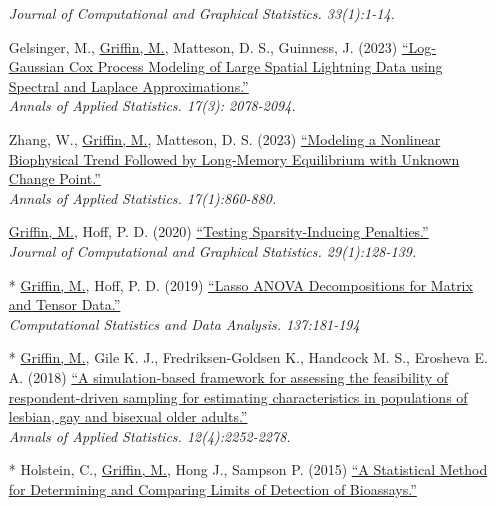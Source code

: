 \documentclass[11pt]{article}
\newcommand{\tab}{\hspace*{2em}}
\begin{document}
\begin{itemize}
	\tab \emph{Journal of Computational and Graphical Statistics. 33(1):1-14.} \vspace{-2mm}
	\item[] Gelsinger, M., \underline{Griffin, M.}, Matteson, D. S., Guinness, J. (2023) \href{https://projecteuclid.org/journals/annals-of-applied-statistics/volume-17/issue-3/Log-Gaussian-Cox-process-modeling-of-large-spatial-lightning-data/10.1214/22-AOAS1708.short}{``Log-Gaussian Cox Process Modeling of Large Spatial Lightning Data using Spectral and Laplace Approximations.''} \\
	\tab \emph{Annals of Applied Statistics. 17(3): 2078-2094.} \vspace{-2mm}
	\item[] Zhang, W., \underline{Griffin, M.}, Matteson, D. S. (2023) \href{https://projecteuclid.org/journals/annals-of-applied-statistics/volume-17/issue-1/Modeling-a-nonlinear-biophysical-trend-followed-by-long-memory-equilibrium/10.1214/22-AOAS1655.short}{``Modeling a Nonlinear Biophysical Trend Followed by Long-Memory Equilibrium with Unknown Change Point.''} \\
	\tab \emph{Annals of Applied Statistics. 17(1):860-880.} \vspace{-2mm}
	\item[] \underline{Griffin, M.}, Hoff, P. D. (2020) \href{https://doi.org/10.1080/10618600.2019.1637749}{``Testing Sparsity-Inducing Penalties.''} \\ 
	\tab \emph{ Journal of Computational and Graphical Statistics. 29(1):128-139.}  \vspace{-2mm}
	\item[*] \underline{Griffin, M.}, Hoff, P. D. (2019) \href{https://doi.org/10.1016/j.csda.2019.02.005}{``Lasso ANOVA Decompositions for Matrix and Tensor Data.''} \\
	\tab \emph{ Computational Statistics and Data Analysis. 137:181-194}  \vspace{-2mm}
	\item[*] \underline{Griffin, M.}, Gile K. J., Fredriksen-Goldsen K., Handcock M. S., Erosheva E. A. (2018) \href{https://projecteuclid.org/euclid.aoas/1542078044}{``A simulation-based framework for assessing the feasibility of respondent-driven sampling for estimating characteristics in populations of lesbian, gay and bisexual older adults.''} \\
	\tab \emph{Annals of Applied Statistics. 12(4):2252-2278.}  \vspace{-2mm}
	\item[*] Holstein, C., \underline{Griffin, M.}, Hong J., Sampson P. (2015) \href{https://pubs.acs.org/doi/abs/10.1021/acs.analchem.5b02082}{``A Statistical Method for Determining and Comparing Limits of Detection of Bioassays.''} \\

\end{itemize}
\end{document}

